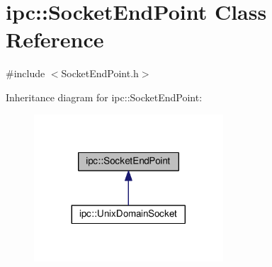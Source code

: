 \hypertarget{classipc_1_1SocketEndPoint}{}\section{ipc\+:\+:Socket\+End\+Point Class Reference}
\label{classipc_1_1SocketEndPoint}


{\ttfamily \#include $<$Socket\+End\+Point.\+h$>$}



Inheritance diagram for ipc\+:\+:Socket\+End\+Point\+:
\nopagebreak
\begin{figure}[H]
\begin{center}
\leavevmode
\includegraphics[width=200pt]{classipc_1_1SocketEndPoint__inherit__graph}
\end{center}
\end{figure}
